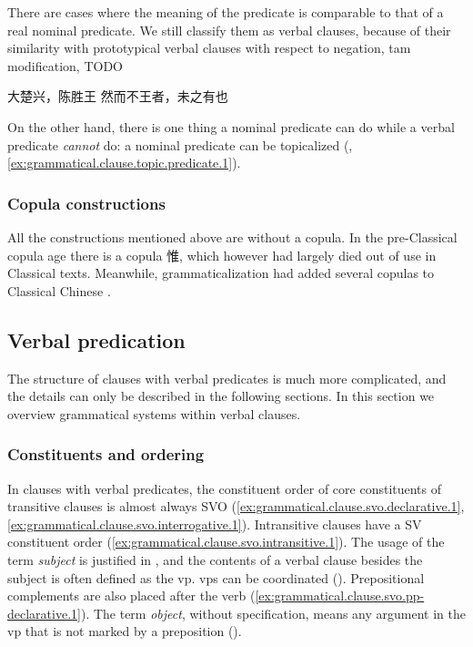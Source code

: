 \documentclass[UTF8, a4paper, oneside, scheme=plain, 12pt]{ctexrep}
\newcommand*{\citepages}[1]{pp.~{#1}}
\newcommand*{\term}[1]{\emph{#1}}
\begin{document}
There are cases where the meaning of the predicate is comparable to that of a real nominal predicate.
We still classify them as verbal clauses,
because of their similarity with prototypical verbal clauses
with respect to negation, \ac{tam} modification, TODO

\begin{exe}
    \ex 大楚兴，陈胜王
    \ex 然而不王者，未之有也
\end{exe}

On the other hand, there is one thing a nominal predicate can do
while a verbal predicate \emph{cannot} do:
a nominal predicate can be topicalized 
(, \ref{ex:grammatical.clause.topic.predicate.1}).

\subsubsection{Copula constructions} 

All the constructions mentioned above are without a copula.
In the pre-Classical copula age there is a copula 惟,
which however had largely died out of use in Classical texts.
Meanwhile, grammaticalization had added several copulas to Classical Chinese
\citep[\citepages{20-22}]{pulleyblank1995outline}.

\subsection{Verbal predication}\label{sec:grammatical.clause.verbal}

The structure of clauses with verbal predicates is much more complicated,
and the details can only be described in the following sections.
In this section we overview grammatical systems within verbal clauses.


\subsubsection{Constituents and ordering}\label{sec:grammatical.clause.verbal.linear}

In clauses with verbal predicates,
the constituent order of core constituents of transitive clauses is almost always SVO
(\ref{ex:grammatical.clause.svo.declarative.1}, \ref{ex:grammatical.clause.svo.interrogative.1}).
Intransitive clauses have a SV constituent order
(\ref{ex:grammatical.clause.svo.intransitive.1}).
The usage of the term \term{subject} is justified in ,
and the contents of a verbal clause besides the subject
is often defined as the \ac{vp}.
\Acp{vp} can be coordinated ().
Prepositional complements are also placed after the verb
(\ref{ex:grammatical.clause.svo.pp-declarative.1}).
The term \term{object}, without specification, means any argument in the \ac{vp} that is not marked by a preposition ().
\end{document}
